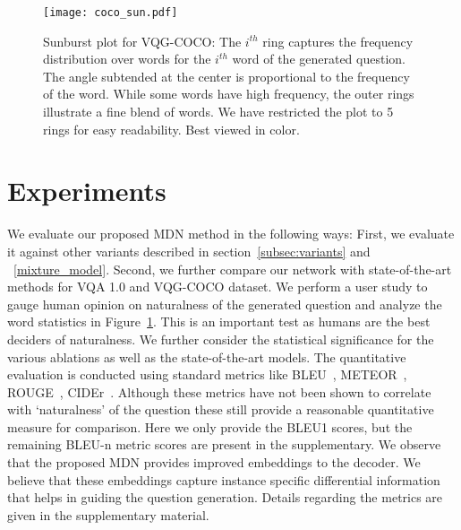 \documentclass[11pt,a4paper]{article}
\begin{document}
\begin{figure}[ht]
	\centering
	\texttt{[image: coco\_sun.pdf]}
\caption{Sunburst plot for VQG-COCO: The $i^{th}$ ring captures the frequency distribution over words for the $i^{th}$ word of the generated question. The angle subtended at the center is proportional to the frequency of the word. While some words have high frequency, the outer rings illustrate a fine blend of words. We have restricted the plot to 5 rings for easy readability. Best viewed in color.}
	\label{tbl:sunburst}
\end{figure}

\section{Experiments}
We evaluate our proposed MDN method in the following ways: First, we evaluate it against other variants described in section~\ref{subsec:variants} and ~\ref{mixture_model}. Second, we further compare our network with state-of-the-art methods  for VQA 1.0 and VQG-COCO dataset.
We perform a user study to gauge human opinion on naturalness of the generated question and analyze the word statistics in Figure~\ref{tbl:sunburst}. This is an important test as humans are the best deciders of naturalness. We further consider the statistical significance for the various ablations as well as the state-of-the-art models. The quantitative evaluation is conducted using standard metrics like BLEU~\cite{Papineni_ACL2002}, METEOR~\cite{Banerjee_ACL2005}, ROUGE~\cite{Lin_ACL2004}, CIDEr~\cite{Vedantam_CVPR2015}. Although these metrics have not been shown to correlate with `naturalness' of the question these still provide a reasonable quantitative measure for comparison. Here we only provide the BLEU1 scores, but the remaining BLEU-n metric scores are present in the supplementary. We observe that the proposed MDN provides improved embeddings to the decoder. We believe that these embeddings capture instance specific differential information that helps in guiding the question generation. Details regarding the metrics  are given in the supplementary material.



\label{sec:results}
\end{document}
